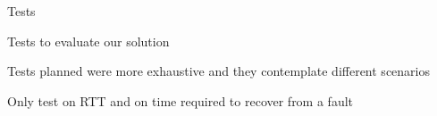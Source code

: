 \begin{frame}{Tests}

  Tests to evaluate our solution

  \vfill{}

  Tests planned were more exhaustive and they contemplate different scenarios

  \vfill{}

  Only test on RTT and on time required to recover from a fault

\end{frame}
